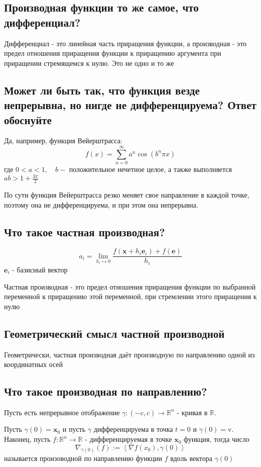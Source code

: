 \documentclass[a4paper]{article}
\begin{document}
\subsection{Производная функции то же самое, что дифференциал?}

Дифференциал - это линейная часть приращения функции, а производная - это предел отношения приращения функции к приращению аргумента при приращении стремящемся к нулю. Это не одно и то же

\subsection{Может ли быть так, что функция везде непрерывна, но нигде не дифференцируема? Ответ обоснуйте}


Да, например, функция Вейерштрасса:
$$\boxed{
f(x)=\sum_{n=0}^{\infty} a^{n} \cos \left(b^{n} \pi x\right)
}$$
где $0<a<1, \quad b-$ положительное нечетное целое, а также выполняется $a b>1+\frac{3 \pi}{2}$

По сути функция Вейерштрасса резко меняет свое направление в каждой точке, поэтому она не дифференцируема, и при этом она непрерывна.

\subsection{Что такое частная производная?}
$$a_i=\lim\limits_{h_i\mapsto0} \frac{f(\mathbf{x}+h_i\mathbf{e}_i)+f(\mathbf{e})}{h_i}$$
$\mathbf{e}_i$ - базисный вектор

Частная производная - это предел отношения приращения функции по выбранной переменной к приращению этой переменной, при стремлении этого приращения к нулю
\subsection{Геометрический смысл частной производной}
Геометрически, частная производная даёт производную по направлению одной из координатных осей
\subsection{Что такое производная по направлению?}

Пусть есть непрерывное отображение $\gamma:(-c, c) \rightarrow \mathbb{R}^{n}$ - кривая в $\mathbb{R}$.

Пусть $\gamma(0)=\mathbf{x}_{0}$ и пусть $\gamma$ дифференцируема в точка $t=0$ и $\dot\gamma(0)=\mathrm{v}$. Наконец, пусть
$f: \mathbb{R}^{n} \rightarrow \mathbb{R}$ - дифференцируемая в точке $\mathbf{x}_{0}$ функция, тогда число
$$
\nabla_{\dot\gamma(0)}(f):=\left\langle\nabla f\left(x_{0}\right), \gamma(0)\right\rangle
$$
называется произоводной по направлению функции $f$ вдоль вектора $\gamma(0)$
\end{document}

